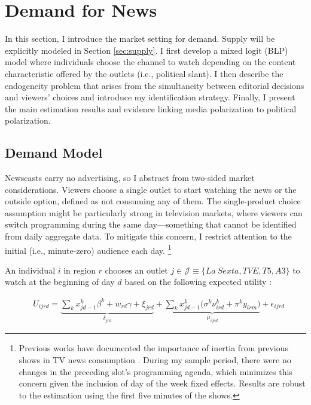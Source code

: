\documentclass[12pt]{article}
\begin{document}
\section{Demand for News}	\label{sec:demand}

In this section, I introduce the market setting for demand. Supply will be explicitly modeled in Section \ref{sec:supply}. I first develop a mixed logit (BLP) model \citep{berry_blp} where individuals choose the channel to watch depending on the content characteristic offered by the outlets (i.e., political slant). I then describe the endogeneity problem that arises from the simultaneity between editorial decisions and viewers' choices and introduce my identification strategy. Finally, I present the main estimation results and evidence linking media polarization to political polarization. 

\subsection{Demand Model}



Newscasts carry no advertising, so I abstract from two-sided market considerations. Viewers choose a single outlet to start watching the news or the outside option, defined as not consuming any of them. The single-product choice assumption might be particularly strong in television markets, where viewers can switch programming during the same day—something that cannot be identified from daily aggregate data. To mitigate this concern, I restrict attention to the initial (i.e., minute-zero) audience each day. \footnote{Previous works have documented the importance of inertia from previous shows in TV news consumption \citep{richter2025structural}. During my sample period, there were no changes in the preceding slot's programming agenda, which minimizes this concern given the inclusion of day of the week fixed effects. Results are robust to the estimation using the first five minutes of the shows. }



An individual $ i $  in region $r$ chooses an outlet $ j \in \mathcal{J}\equiv \{La \ Sexta,TVE,T5,A3\}$  to watch at the beginning of day $d$ based on the following expected utility : 


\begin{equation}\label{eq:utility}
	\begin{aligned}
		& U_{ijrd}= \underbrace{\sum_k x_{jd-1}^k\beta^k+w_{rd}   \gamma  +  \xi_{jrd}}_{\delta_{jrd}}  + \underbrace{  \sum_k x_{jd-1}^k \Big( \sigma^k \nu_{ird}^k  + \pi^ky_{irm} \Big)}_{\mu_{ijrd}}+\epsilon_{ijrd} 
	\end{aligned}
\end{equation} 
\end{document}

